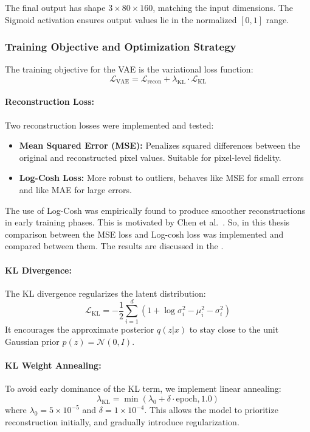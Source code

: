 The final output has shape $3 \times 80 \times 160$, matching the input dimensions. The Sigmoid activation ensures output values lie in the normalized $[0,1]$ range.

\subsubsection{Training Objective and Optimization Strategy} \label{subsubsec:vae_loss}

The training objective for the VAE is the variational loss function:
\[
\mathcal{L}_{\text{VAE}} = \mathcal{L}_{\text{recon}} + \lambda_{\text{KL}} \cdot \mathcal{L}_{\text{KL}}
\]

\paragraph{Reconstruction Loss:} \label{reconstruction_loss}
Two reconstruction losses were implemented and tested:
\begin{itemize}
    \item \textbf{Mean Squared Error (MSE):} Penalizes squared differences between the original and reconstructed pixel values. Suitable for pixel-level fidelity.
    \item \textbf{Log-Cosh Loss:} More robust to outliers, behaves like MSE for small errors and like MAE for large errors.
\end{itemize}
The use of Log-Cosh was empirically found to produce smoother reconstructions in early training phases. This is motivated by Chen et al.~\cite{chen2019log}. So, in this thesis comparison between the MSE loss and Log-cosh loss was implemented and compared between them. The results are discussed in the     .

\paragraph{KL Divergence:}
The KL divergence regularizes the latent distribution:
\[
\mathcal{L}_{\text{KL}} = -\frac{1}{2} \sum_{i=1}^{d} \left(1 + \log\sigma_i^2 - \mu_i^2 - \sigma_i^2\right)
\]
It encourages the approximate posterior $q(z|x)$ to stay close to the unit Gaussian prior $p(z) = \mathcal{N}(0, I)$.

\paragraph{KL Weight Annealing:}
To avoid early dominance of the KL term, we implement linear annealing:
\[
\lambda_{\text{KL}} = \min(\lambda_0 + \delta \cdot \text{epoch}, 1.0)
\]
where $\lambda_0 = 5 \times 10^{-5}$ and $\delta = 1 \times 10^{-4}$. This allows the model to prioritize reconstruction initially, and gradually introduce regularization.

